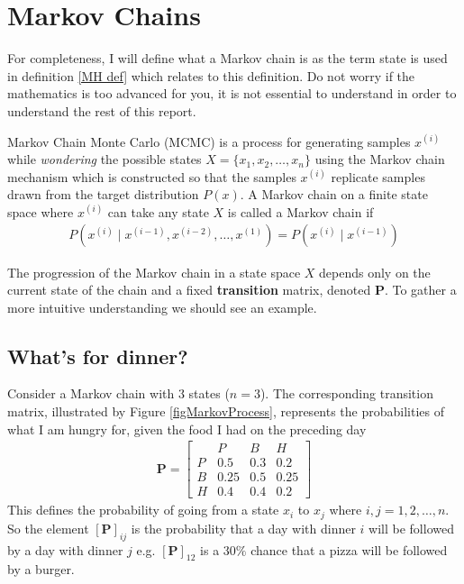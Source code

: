 \documentclass[12pt,twoside]{report}   %
\begin{document}
\section{Markov Chains}\label{markov chains}
\vspace{-0.4in}
\underline{\hspace{6.2in}}
\vspace{-0.1in}

For completeness, I will define what a Markov chain is as the term state is used in definition \ref{MH def} which relates to this definition. Do not worry if the mathematics is too advanced for you, it is not essential to understand in order to understand the rest of this report.

Markov Chain Monte Carlo (MCMC) is a process for generating samples $x^{(i)}$ while \textit{wondering} the possible states $X = \{x_1,x_2,\ldots,x_n\}$ using the Markov chain mechanism which is constructed so that the samples $x^{(i)}$ replicate samples drawn from the target distribution $P(x)$. A Markov chain on a finite state space where $x^{(i)}$ can take any state $X$ is called a Markov chain if 
\begin{align}\label{Markov Chain Def}
P(x^{(i)}\mid x^{(i-1)},x^{(i-2)},\ldots,x^{(1)}) = P(x^{(i)}\mid x^{(i-1)})
\end{align}

The progression of the Markov chain in a state space $X$ depends only on the current state of the chain and a fixed \textbf{transition} matrix, denoted \textbf{P}. To gather a more intuitive understanding we should see an example.

\subsection{What's for dinner?}\label{What's for Dinner}
\vspace{-0.35in}
\underline{\hspace{6.2in}}
\vspace{-0.1in}

Consider a Markov chain with $3$ states ($n=3$). The corresponding transition matrix, illustrated by Figure \ref{figMarkovProcess}, represents the probabilities of what I am hungry for, given the food I had on the preceding day
\begin{align*}
\textbf{P} = \begin{bmatrix}
	& P & B & H \\
    P & 0.5 & 0.3 & 0.2 \\
    B & 0.25 & 0.5 & 0.25 \\
    H & 0.4 & 0.4 & 0.2
\end{bmatrix}
\end{align*}
This defines the probability of going from a state $x_i$ to $x_j$ where $i,j = 1,2,\ldots,n$. So the element $[\textbf{P}]_{ij}$ is the probability that a day with dinner $i$ will be followed by a day with dinner $j$ e.g. $[\textbf{P}]_{12}$ is a $30\%$ chance that a pizza will be followed by a burger.
\end{document}
